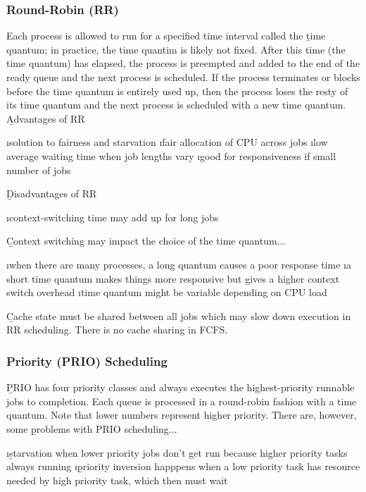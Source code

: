 \documentclass{article}
\begin{document}
    \subsubsection{Round-Robin (RR)}

    Each process is allowed to run for a specified time interval called the \b{time quantum}; in practice, the time quantim is likely not fixed. After this time (the time quantum) has elapsed, the process is preempted and added to the end of the ready queue and the next process is scheduled. If the process terminates or blocks before the time quantum is entirely used up, then the process loses the resty of its time quantum and the next process is scheduled with a new time quantum. \\
    
    \noindent \b{Advantages of RR}

    \bl
    \i solution to fairness and starvation
    \i fair allocation of CPU across jobs
    \i low average waiting time when job lengths vary
    \i good for responsiveness if small number of jobs
    \el

    \noindent \b{Disadvantages of RR}

    \bl 
    \i context-switching time may add up for long jobs
    \el 

    \noindent \b{Context switching} may impact the choice of the time quantum...

    \bl 
    \i when there are many processes, a long quantum causes a poor response time
    \i a short time quantum makes things more responsive but gives a higher context switch overhead
    \i time quantum might be variable depending on CPU load
    \el

    \noindent \b{Cache state} must be shared between all jobs which may slow down execution in RR scheduling. There is no cache sharing in FCFS. 

    \subsubsection{Priority (PRIO) Scheduling}

    \b{PRIO} has four priority classes and always executes the highest-priority runnable jobs to completion. Each queue is processed in a round-robin fashion with a time quantum. Note that lower numbers represent higher priority. There are, however, some \b{problems} with PRIO scheduling...

    \bl 
    \i \b{starvation} when lower priority jobs don't get run because higher priority tasks always running
    \i \b{priority inversion} happpens when a low priority task has resource needed by high priority task, which then must wait
    \el
\end{document}
